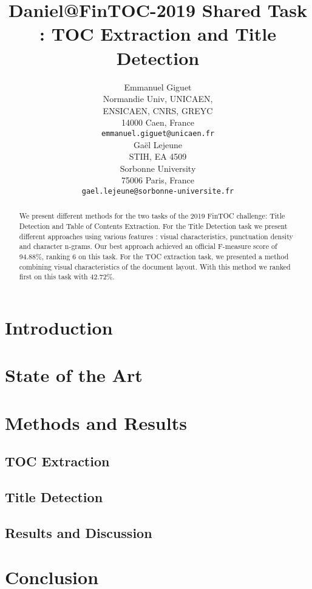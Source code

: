 \documentclass[11pt,a4paper]{article}
\title{Daniel@FinTOC-2019 Shared Task : TOC Extraction and Title Detection}
\author{\hspace{-2.2cm}Emmanuel Giguet \\
  \hspace{-2.2cm}Normandie Univ, UNICAEN, \\
  \hspace{-2.2cm} ENSICAEN, CNRS, GREYC\\
  \hspace{-2.2cm}14000 Caen, France\\
  \hspace{-2.2cm}\texttt{emmanuel.giguet@unicaen.fr} \\\And
  Ga\"el Lejeune \\
  STIH, EA 4509\\
  Sorbonne University\\
  75006 Paris, France\\
  \texttt{gael.lejeune@sorbonne-universite.fr} \\}
\begin{document}
\maketitle
\begin{abstract}
We present different methods for the two tasks of the 2019 FinTOC challenge: Title Detection and Table of Contents Extraction.
For the Title Detection task we present different approaches using various features : visual characteristics, punctuation density and character n-grams. Our best approach achieved an official F-measure score of 94.88\%, ranking 6 on this task.
For the TOC extraction task, we presented a method combining visual characteristics of the document layout. With this method we ranked first on this task with 42.72\%.
\end{abstract}

\section{Introduction}


\section{State of the Art}
\label{sec:soa}


\section{Methods and Results}
\label{sec:meth}

\subsection{TOC Extraction}
\label{sec:TOC}


\subsection{Title Detection}
\label{sec:title}


\subsection{Results and Discussion}
\label{sec:disc}


\section{Conclusion}
\label{sec:conclusion}

\end{document}

